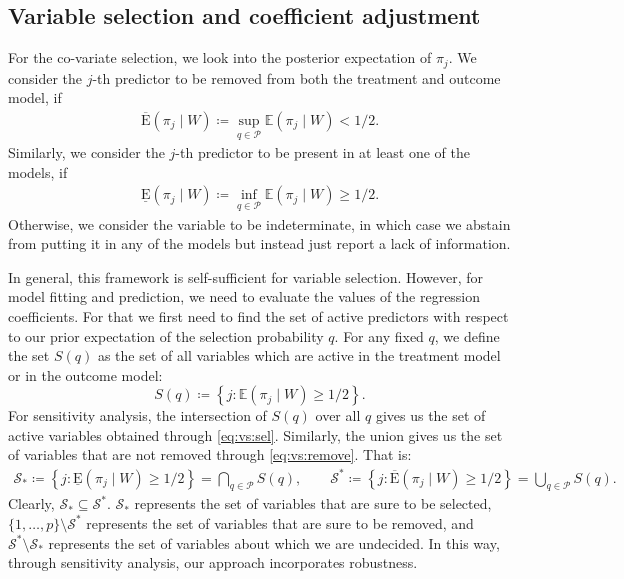 \documentclass{amsart}
\newcommand{\lexp}{\underline{\text{E}}}
\newcommand{\uexp}{\overline{\text{E}}}
\begin{document}
\subsection{Variable selection and coefficient adjustment}
For the co-variate selection, we look into the posterior expectation of $\pi_j$. 
We consider the $j$-th predictor to be removed from both the
treatment and outcome model, if
\begin{align}\label{eq:vs:remove}
	\uexp (\pi_j\mid W)\coloneqq \sup_{q\in \mathcal{P}} \mathbb{E}(\pi_j\mid W) < 1/2.
\end{align}
Similarly, we consider the $j$-th predictor to be present in at least one of the models, if
\begin{align}\label{eq:vs:sel}
	\lexp (\pi_j\mid W)\coloneqq \inf_{q\in \mathcal{P}} \mathbb{E}(\pi_j\mid W) \ge 1/2.
\end{align}
Otherwise, we consider the variable to be indeterminate,  in which case we abstain from putting
it in any of the models but instead just report a lack of information.

In general, this framework is
self-sufficient
for variable selection. However, for
model fitting and prediction, we need to evaluate the values 
of the regression coefficients. For that we first need to find the set of active
predictors with respect to our prior expectation of the selection probability $q$.
For any fixed $q$, we define the set $S(q)$ as the set of all variables which are active
in the treatment model or in the outcome model:
\begin{equation}
	S(q)\coloneqq
	\left\{j\colon \mathbb{E}(\pi_j\mid W) \ge 1/2\right\}.
\end{equation}
For sensitivity analysis,
the intersection of $S(q)$ over all $q$ gives us the set of
active variables obtained through \cref{eq:vs:sel}.
Similarly, the union gives us the set of
variables that are not removed through \cref{eq:vs:remove}.
That is:
\begin{align}
    \mathcal{S}_*\coloneqq \left\{j:\lexp (\pi_j\mid W)\ge1/2\right\}
    = \bigcap_{q\in \mathcal{P}}S(q),
    \qquad \mathcal{S}^*\coloneqq \left\{j:\uexp (\pi_j\mid W)\ge1/2\right\}
    = \bigcup_{q\in \mathcal{P}}S(q).
\end{align}
Clearly, $\mathcal{S}_*\subseteq\mathcal{S}^*$.
$\mathcal{S}_*$ represents the set of variables that are sure to be selected,
$\{1,\dots,p\}\setminus\mathcal{S}^*$ represents the set of variables that are sure to be removed, and
$\mathcal{S}^*\setminus\mathcal{S}_*$ represents the set of variables about which we are undecided.
In this way, through sensitivity analysis, our approach incorporates robustness.
\end{document}
